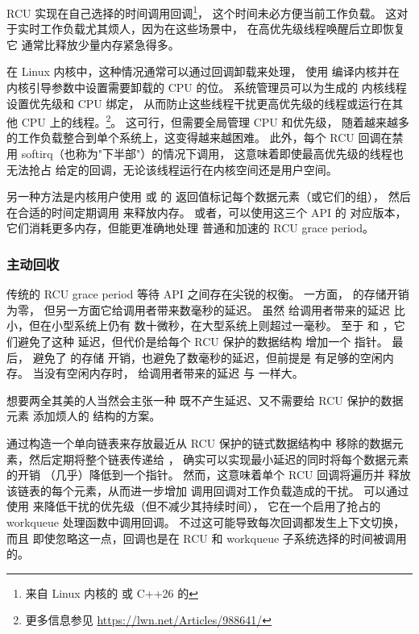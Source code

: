 RCU 实现在自己选择的时间调用回调\footnote{
	来自 Linux 内核的  或 C++26 的 }，
这个时间未必方便当前工作负载。
这对于实时工作负载尤其烦人，因为在这些场景中，
在高优先级线程唤醒后立即恢复它
通常比释放少量内存紧急得多。

在 Linux 内核中，这种情况通常可以通过回调卸载来处理，
使用  编译内核并在
 内核引导参数中设置需要卸载的 CPU 的位。
系统管理员可以为生成的  内核线程设置优先级和 CPU 绑定，
从而防止这些线程干扰更高优先级的线程或运行在其他 CPU 上的线程。\footnote{
	更多信息参见 \url{https://lwn.net/Articles/988641/}}。
这可行，但需要全局管理 CPU 和优先级，
随着越来越多的工作负载整合到单个系统上，这变得越来越困难。
此外，每个 RCU 回调在禁用 softirq（也称为"下半部"）的情况下调用，
这意味着即使最高优先级的线程也无法抢占
给定的回调，无论该线程运行在内核空间还是用户空间。

另一种方法是内核用户使用
 或  的
返回值标记每个数据元素（或它们的组），
然后在合适的时间定期调用  来释放内存。
或者，可以使用这三个 API 的  对应版本，
它们消耗更多内存，但能更准确地处理
普通和加速的 RCU grace period。

\subsubsection{主动回收}
\label{sec:together:Proactive Reclamation}

传统的 RCU grace period 等待 API 之间存在尖锐的权衡。
一方面， 的存储开销为零，
但另一方面它给调用者带来数毫秒的延迟。
虽然  给调用者带来的延迟
比  小，但在小型系统上仍有
数十微秒，在大型系统上则超过一毫秒。
至于  和 ，它们避免了这种
延迟，但代价是给每个 RCU 保护的数据结构
增加一个  指针。
最后， 避免了  的存储
开销，也避免了数毫秒的延迟，但前提是
有足够的空闲内存。
当没有空闲内存时， 给调用者带来的延迟
与  一样大。

想要两全其美的人当然会主张一种
既不产生延迟、又不需要给 RCU 保护的数据元素
添加烦人的  结构的方案。

通过构造一个单向链表来存放最近从 RCU 保护的链式数据结构中
移除的数据元素，然后定期将整个链表传递给 ，
确实可以实现最小延迟的同时将每个数据元素的开销
（几乎）降低到一个指针。
然而，这意味着单个 RCU 回调将遍历并
释放该链表的每个元素，从而进一步增加
调用回调对工作负载造成的干扰。
可以通过使用  来降低干扰的优先级（但不减少其持续时间），
它在一个启用了抢占的 workqueue 处理函数中调用回调。
不过这可能导致每次回调都发生上下文切换，而且
即使忽略这一点，回调也是在 RCU 和
workqueue 子系统选择的时间被调用的。

